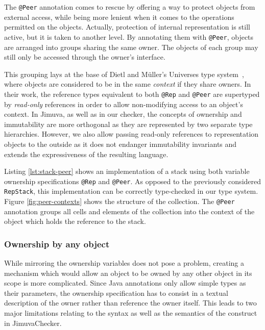 \documentclass{pracamgr}
\theoremstyle{break}
\theoremstyle{break}
\theoremstyle{break}
\begin{document}
The \texttt{@Peer} annotation comes to rescue by offering a way to
protect objects from external access, while being more lenient when it
comes to the operations permitted on the objects. Actually, protection
of internal representation is still active, but it is taken to another
level. By annotating them with \texttt{@Peer}, objects are arranged
into groups sharing the same owner. The objects of each group may
still only be accessed through the owner's interface.

This grouping lays at the base of Dietl and Müller's Universes type
system~\cite{universes}, where objects are considered to be in the
same \emph{context} if they share owners. In their work, the reference
types equivalent to both \texttt{@Rep} and \texttt{@Peer} are
supertyped by \emph{read-only} references in order to allow
non-modifying access to an object's context. In Jimuva, as well as in
our checker, the concepts of ownership and immutability are more
orthogonal as they are represented by two separate type
hierarchies. However, we also allow passing read-only references to
representation objects to the outside as it does not endanger
immutability invariants and extends the expressiveness of the
resulting language.

Listing \ref{lst:stack-peer} shows an implementation of a stack using
both variable ownership specifications \texttt{@Rep} and
\texttt{@Peer}. As opposed to the previously considered
\texttt{RepStack}, this implementation can be correctly type-checked
in our type system. Figure \ref{fig:peer-contexts} shows the structure
of the collection. The \texttt{@Peer} annotation groups all cells and
elements of the collection into the context of the object which holds
the reference to the stack.

\subsubsection{Ownership by any object}

While mirroring the ownership variables does not pose a problem,
creating a mechanism which would allow an object to be owned by any
other object in its scope is more complicated. Since Java annotations
only allow simple types as their parameters, the ownership
specification has to consist in a textual description of the owner
rather than reference the owner itself. This leads to two major
limitations relating to the syntax as well as the semantics of the
construct in JimuvaChecker.
\end{document}
